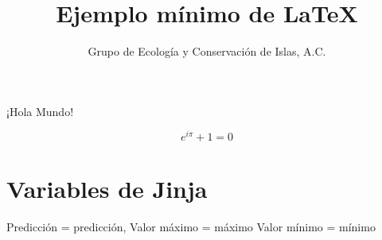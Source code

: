 \documentclass{article}
\begin{document}
\title{Ejemplo mínimo de \LaTeX}
\author{Grupo de Ecología y Conservación de Islas, A.C.}
\maketitle

¡Hola Mundo!

$$ e^{i\pi} + 1 = 0 $$

\section*{Variables de Jinja}
Predicción = predicción,
Valor máximo = máximo
Valor mínimo = mínimo
\end{document}
